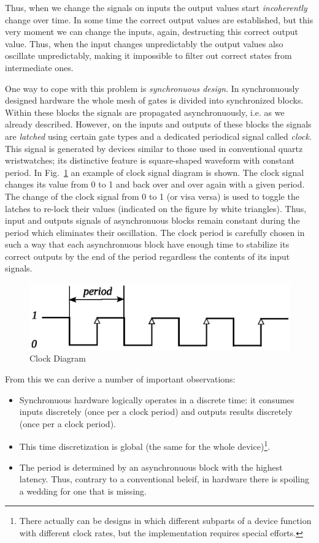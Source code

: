 Thus, when we change the signals on inputs the output values start \emph{incoherently} change over time. In some time
the correct output values are established, but this very moment we can change the inputs, again, destructing this correct
output value. Thus, when the input changes unpredictably the output values also oscillate unpredictably, making it
impossible to filter out correct states from intermediate ones.

One way to cope with this problem is \emph{synchronuous design}. In synchronuously designed hardware the whole
mesh of gates is divided into synchronized blocks. Within these blocks the signals are propagated asynchronuously, i.e.
as we already described. However, on the inputs and outputs of these blocks the signals are \emph{latched}
using certain gate types and a dedicated periodical signal called \emph{clock}. This signal is generated by devices
similar to those used in conventional quartz wristwatches; its distinctive feature is square-shaped waveform with
constant period. In Fig.~\ref{clock-diagram} an example of clock signal diagram is shown. The clock signal changes
its value from 0 to 1 and back over and over again with a given period. The change of the clock signal from 0 to 1 (or visa versa)
is used to toggle the latches to re-lock their values (indicated on the figure by white triangles). Thus, input and outputs
signals of asynchronuous blocks remain constant during the period which eliminates their oscillation. The clock period is carefully
chosen in such a way that each asynchronuous block have enough time to stabilize its correct outputs by the end of the period
regardless the contents of its input signals. 

\begin{figure}[t]
  \centering
  \includegraphics[scale=0.7]{images/06-10.eps}
  \caption{Clock Diagram}
  \label{clock-diagram}
\end{figure}

From this we can derive a number of important observations:

\begin{itemize}
\item Synchronuous hardware logically operates in a discrete time: it consumes inputs discretely (once per a clock period) and
  outputs results discretely (once per a clock period).
\item This time discretization is global (the same for the whole device)\footnote{There actually can be designs in which different
subparts of a device function with different clock rates, but the implementation requires special efforts.}.
\item The period is determined by an asynchronuous block with the highest latency. Thus, contrary to a conventional beleif, in hardware
there is spoiling a wedding for one that is missing.
\end{itemize}

